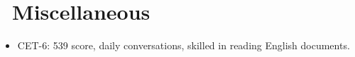 \documentclass{resume}
\begin{document}
\section{\faPlusCircle\ Miscellaneous}
\begin{itemize}[parsep=0.5ex]
  \item CET-6: 539 score, daily conversations, skilled in reading English documents.
\end{itemize}

%
%
\end{document}
